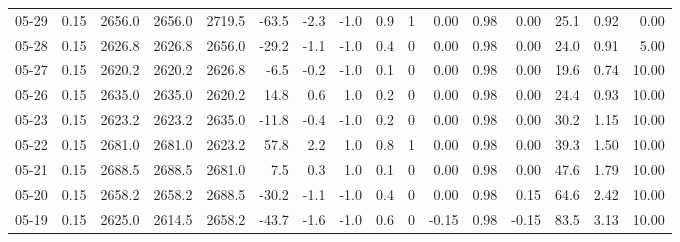 \begin{threeparttable}
{\begin{tabular}{lrrrrrrrrrrrrrrr}
  05-29 &     0.15 & 2656.0 & 2656.0 & 2719.5 &      -63.5 &           -2.3 &                     -1.0 &                 0.9 &              1 &       0.00 &      0.98 &           0.00 &             25.1 &            0.92 &                   0.00 \\
  05-28 &     0.15 & 2626.8 & 2626.8 & 2656.0 &      -29.2 &           -1.1 &                     -1.0 &                 0.4 &              0 &       0.00 &      0.98 &           0.00 &             24.0 &            0.91 &                   5.00 \\
  05-27 &     0.15 & 2620.2 & 2620.2 & 2626.8 &       -6.5 &           -0.2 &                     -1.0 &                 0.1 &              0 &       0.00 &      0.98 &           0.00 &             19.6 &            0.74 &                  10.00 \\
  05-26 &     0.15 & 2635.0 & 2635.0 & 2620.2 &       14.8 &            0.6 &                      1.0 &                 0.2 &              0 &       0.00 &      0.98 &           0.00 &             24.4 &            0.93 &                  10.00 \\
  05-23 &     0.15 & 2623.2 & 2623.2 & 2635.0 &      -11.8 &           -0.4 &                     -1.0 &                 0.2 &              0 &       0.00 &      0.98 &           0.00 &             30.2 &            1.15 &                  10.00 \\
  05-22 &     0.15 & 2681.0 & 2681.0 & 2623.2 &       57.8 &            2.2 &                      1.0 &                 0.8 &              1 &       0.00 &      0.98 &           0.00 &             39.3 &            1.50 &                  10.00 \\
  05-21 &     0.15 & 2688.5 & 2688.5 & 2681.0 &        7.5 &            0.3 &                      1.0 &                 0.1 &              0 &       0.00 &      0.98 &           0.00 &             47.6 &            1.79 &                  10.00 \\
  05-20 &     0.15 & 2658.2 & 2658.2 & 2688.5 &      -30.2 &           -1.1 &                     -1.0 &                 0.4 &              0 &       0.00 &      0.98 &           0.15 &             64.6 &            2.42 &                  10.00 \\
  05-19 &     0.15 & 2625.0 & 2614.5 & 2658.2 &      -43.7 &           -1.6 &                     -1.0 &                 0.6 &              0 &      -0.15 &      0.98 &          -0.15 &             83.5 &            3.13 &                  10.00 \\

\end{tabular}}
\end{threeparttable}

